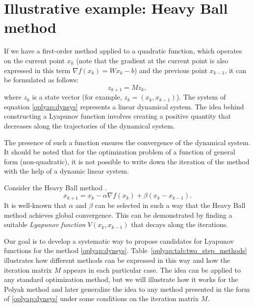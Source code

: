 \documentclass[a4paper,11pt]{article}
\begin{document}
\section{Illustrative example: Heavy Ball method}

If we have a first-order method applied to a quadratic function, which operates on the current point $ x_k $ (note that the gradient at the current point is also expressed in this term $ \nabla f(x_k) = W x_k - b $) and the previous point $ x_{k-1} $, it can be formulated as follows:
\begin{equation}
    \label{oplyap:dynsys}
    z_{k+1} = Mz_k,
\end{equation}
where $ z_k $ is a state vector (for example, $ z_{k} = (x_k, x_{k-1}) $). The system of equation \eqref{oplyap:dynsys} represents a linear dynamical system. The idea behind constructing a Lyapunov function involves creating a positive quantity that decreases along the trajectories of the dynamical system.

The presence of such a function ensures the convergence of the dynamical system. It should be noted that for the optimization problem of a function of general form (non-quadratic), it is not possible to write down the iteration of the method with the help of a dynamic linear system.

Consider the Heavy Ball method \cite{polyak1964some}.
\begin{equation}\label{oplyap:polyak}
    x_{k+1} = x_k - \alpha \nabla f(x_k) + \beta (x_k - x_{k-1}).
\end{equation}
It is well-known \cite{polyak1964some, ghadimi2015global} that $ \alpha $ and $ \beta $ can be selected in such a way that the Heavy Ball method achieves global convergence. This can be demonstrated by finding a suitable \emph{Lyapunov function} $ V(x_k, x_{k-1}) $ that decays along the iterations.

Our goal is to develop a systematic way to propose candidates for Lyapunov functions for the method \eqref{oplyap:dynsys}. Table~\ref{oplyap:tab:two_step_methods} illustrates how different methods can be expressed in this way and how the iteration matrix $ M $ appears in each particular case. The idea can be applied to any standard optimization method, but we will illustrate how it works for the Polyak method and later generalize the idea to any method presented in the form of \eqref{oplyap:dynsys} under some conditions on the iteration matrix $ M $.
\end{document}
